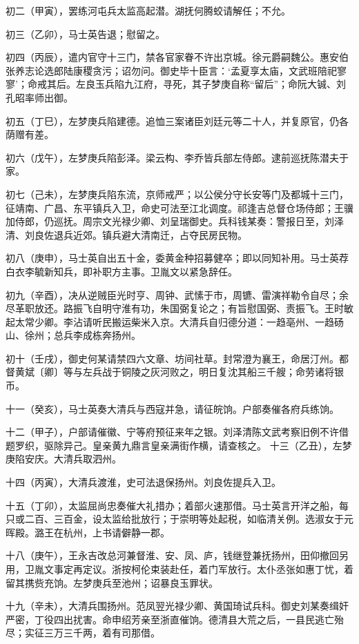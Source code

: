 \documentclass[]{article}
\begin{document}
初二（甲寅），罢练河屯兵太监高起潜。湖抚何腾蛟请解任；不允。

初三（乙卯），马士英告退；慰留之。

初四（丙辰），遣内官守十三门，禁各官家眷不许出京城。徐元爵嗣魏公。惠安伯张养志论选郎陆康稷贪污；诏勿问。御史毕十臣言：`孟夏享太庙，文武班陪祀寥寥'；命戒其后。左良玉兵陷九江府，寻死，其子梦庚自称``留后''；命阮大铖、刘孔昭率师出御。

初五（丁巳），左梦庚兵陷建德。追恤三案诸臣刘廷元等二十人，并复原官，仍各荫赠有差。

初六（戊午），左梦庚兵陷彭泽。梁云构、李乔皆兵部左侍郎。逮前巡抚陈潜夫于家。

初七（己未），左梦庚兵陷东流，京师戒严；以公侯分守长安等门及都城十三门，征靖南、广昌、东平镇兵入卫，命史可法至江北调度。祁逢吉总督仓场侍郎；王骥加侍郎，仍巡抚。周宗文光禄少卿、刘呈瑞御史。兵科钱某奏：警报日至，刘泽清、刘良佐退兵近郊。镇兵避大清南迁，占夺民房民物。

初八（庚申），马士英自出五十金，委黄金种招募健卒；即以同知补用。马士英荐白衣李毓新知兵，即补职方主事。卫胤文以紧急辞任。

初九（辛酉），决从逆贼臣光时亨、周钟、武愫于市，周镳、雷演祥勒令自尽；余尽革职放还。路振飞自明守淮有功，朱国弼复论之；有旨慰国弼、责振飞。王时敏起太常少卿。李沾请听民搬运柴米入京。大清兵自归德分道：一趋亳州、一趋砀山、徐州；总兵李成栋奔扬州。

初十（壬戌），御史何某请禁四六文章、坊间社草。封常澄为襄王，命居汀州。都督黄斌〔卿〕等与左兵战于铜陵之灰河败之，明日复沈其船三千艘；命劳诸将银币。

十一（癸亥），马士英奏大清兵与西寇并急，请征皖饷。户部奏催各府兵练饷。

十二（甲子），户部请催徽、宁等府预征来年之银。刘泽清陈文武考察旧例不许借题罗织，驱除异己。皇亲黄九鼎言皇亲满街作横，请查核之。
十三（乙丑），左梦庚陷安庆。大清兵取泗州。

十四（丙寅），大清兵渡淮，史可法退保扬州。刘良佐提兵入卫。

十五（丁卯），太监屈尚忠奏催大礼措办；着部火速那借。马士英言开洋之船，每只或二百、三百金，设太监给批放行；于崇明等处起税，如临清关例。选淑女于元晖殿。潞王在杭州，上书请僻静一郡。

十八（庚午），王永吉改总河兼督淮、安、凤、庐，钱继登兼抚扬州，田仰撤回另用，卫胤文事定再定议。浙按柯伦束装赴任，着门军放行。太仆丞张如惠丁忧，着留其携赀充饷。左梦庚兵至池州；诏暴良玉罪状。

十九（辛未），大清兵围扬州。范凤翌光禄少卿、黄国琦试兵科。御史刘某奏缉奸严密，丁役四出扰害。命申绍芳亲至浙直催饷。德清县大荒之后，一县民逃亡殆尽；实征三万三千两，着有司那借。
\end{document}
